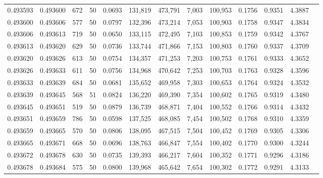 \begin{tabular}{rrrrrrrrrrrrr}
0.493593 & 0.493600 &   672 &  50 &                                     0.0693 & 131,819 & 473,791 &   7,003 & 100,953 & 0.1756 & 0.9351 & 4.3887 \\
0.493600 & 0.493606 &   577 &  50 &                                     0.0797 & 132,396 & 473,214 &   7,053 & 100,903 & 0.1758 & 0.9347 & 4.3834 \\
0.493606 & 0.493613 &   719 &  50 &                                     0.0650 & 133,115 & 472,495 &   7,103 & 100,853 & 0.1759 & 0.9342 & 4.3767 \\
0.493613 & 0.493620 &   629 &  50 &                                     0.0736 & 133,744 & 471,866 &   7,153 & 100,803 & 0.1760 & 0.9337 & 4.3709 \\
0.493620 & 0.493626 &   613 &  50 &                                     0.0754 & 134,357 & 471,253 &   7,203 & 100,753 & 0.1761 & 0.9333 & 4.3652 \\
0.493626 & 0.493633 &   611 &  50 &                                     0.0756 & 134,968 & 470,642 &   7,253 & 100,703 & 0.1763 & 0.9328 & 4.3596 \\
0.493633 & 0.493639 &   684 &  50 &                                     0.0681 & 135,652 & 469,958 &   7,303 & 100,653 & 0.1764 & 0.9324 & 4.3532 \\
0.493639 & 0.493645 &   568 &  51 &                                     0.0824 & 136,220 & 469,390 &   7,354 & 100,602 & 0.1765 & 0.9319 & 4.3480 \\
0.493645 & 0.493651 &   519 &  50 &                                     0.0879 & 136,739 & 468,871 &   7,404 & 100,552 & 0.1766 & 0.9314 & 4.3432 \\
0.493651 & 0.493659 &   786 &  50 &                                     0.0598 & 137,525 & 468,085 &   7,454 & 100,502 & 0.1768 & 0.9310 & 4.3359 \\
0.493659 & 0.493665 &   570 &  50 &                                     0.0806 & 138,095 & 467,515 &   7,504 & 100,452 & 0.1769 & 0.9305 & 4.3306 \\
0.493665 & 0.493671 &   668 &  50 &                                     0.0696 & 138,763 & 466,847 &   7,554 & 100,402 & 0.1770 & 0.9300 & 4.3244 \\
0.493672 & 0.493678 &   630 &  50 &                                     0.0735 & 139,393 & 466,217 &   7,604 & 100,352 & 0.1771 & 0.9296 & 4.3186 \\
0.493678 & 0.493684 &   575 &  50 &                                     0.0800 & 139,968 & 465,642 &   7,654 & 100,302 & 0.1772 & 0.9291 & 4.3133 \\

\end{tabular}
